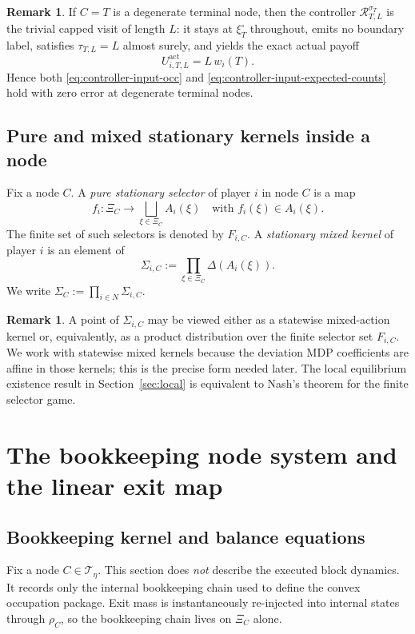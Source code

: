 \documentclass[12pt]{article}
\theoremstyle{definition}
\newtheorem{remark}[theorem]{Remark}
\newcommand{\1}{\mathbf{1}}
\newcommand{\cT}{\mathcal{T}}
\begin{document}
\begin{remark}
If $C=T$ is a degenerate terminal node, then the controller
$\mathcal R_{T,L}^{\sigma_T}$ is the trivial capped visit of length $L$: it
stays at $\xi_T^\circ$ throughout, emits no boundary label, satisfies
$\tau_{T,L}=L$ almost surely, and yields the exact actual payoff
\[
U_{i,T,L}^{\mathrm{act}}=L\,w_i(T).
\]
Hence both \eqref{eq:controller-input-occ} and
\eqref{eq:controller-input-expected-counts} hold with zero error at degenerate
terminal nodes.
\end{remark}


\subsection{Pure and mixed stationary kernels inside a node}

Fix a node $C$. A \emph{pure stationary selector} of player $i$ in node $C$ is a
map
\[
f_i: \Xi_C\to \bigsqcup_{\xi\in\Xi_C}A_i(\xi)
\quad\text{with }f_i(\xi)\in A_i(\xi).
\]
The finite set of such selectors is denoted by $F_{i,C}$. A \emph{stationary
mixed kernel} of player $i$ is an element of
\[
\Sigma_{i,C}:=\prod_{\xi\in\Xi_C}\Delta(A_i(\xi)).
\]
We write $\Sigma_C:=\prod_{i\in N}\Sigma_{i,C}$.

\begin{remark}
A point of $\Sigma_{i,C}$ may be viewed either as a statewise mixed-action kernel
or, equivalently, as a product distribution over the finite selector set
$F_{i,C}$. We work with statewise mixed kernels because the deviation MDP
coefficients are affine in those kernels; this is the precise form needed later.
The local equilibrium existence result in Section~\ref{sec:local} is equivalent to
Nash's theorem for the finite selector game.
\end{remark}

\section{The bookkeeping node system and the linear exit map}
\label{sec:bookkeeping}

\subsection{Bookkeeping kernel and balance equations}

Fix a node $C\in\cT_\eta$. This section does \emph{not} describe the executed
block dynamics. It records only the internal bookkeeping chain used to define the
convex occupation package. Exit mass is instantaneously re-injected into internal
states through $\rho_C$, so the bookkeeping chain lives on $\Xi_C$ alone.
\end{document}
